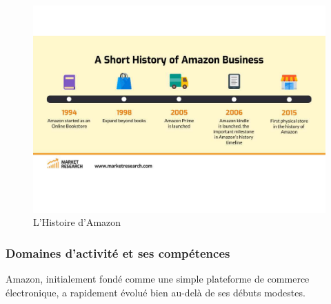 \begin{figure}[htbp]
        \centering
        \includegraphics[width=0.8\linewidth]{./Graphismes-UTC/logos/Amazon/history.pdf}\hfill
        \caption{L'Histoire d'Amazon}
    \end{figure}

\paragraph{}
\vspace{-2em}  %
\subsubsection{Domaines d'activité et ses compétences}
Amazon, initialement fondé comme une simple plateforme de commerce électronique, a rapidement évolué bien au-delà de ses débuts modestes.
